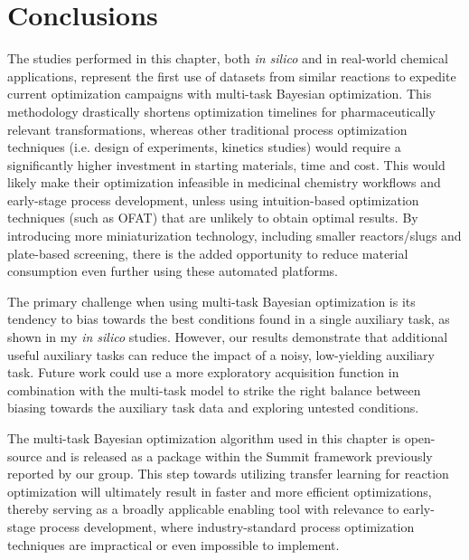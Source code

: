 \section{Conclusions}

The studies performed in this chapter, both \textit{in silico} and in real-world chemical applications, represent the first use of datasets from similar reactions to expedite current optimization campaigns with multi-task Bayesian optimization. This methodology drastically shortens optimization timelines for pharmaceutically relevant transformations, whereas other traditional process optimization techniques (i.e. design of experiments, kinetics studies) would require a significantly higher investment in starting materials, time and cost. This would likely make their optimization infeasible in medicinal chemistry workflows and early-stage process development, unless using intuition-based optimization techniques (such as OFAT) that are unlikely to obtain optimal results. By introducing more miniaturization technology, including smaller reactors/slugs and plate-based screening, there is the added opportunity to reduce material consumption even further using these automated platforms. 

The primary challenge when using multi-task Bayesian optimization is its tendency to bias towards the best conditions found in a single auxiliary task, as shown in my \textit{in silico} studies. However, our results demonstrate that additional useful auxiliary tasks can reduce the impact of a noisy, low-yielding auxiliary task. Future work could use a more exploratory acquisition function in combination with the multi-task model to strike the right balance between biasing towards the auxiliary task data and exploring untested conditions.

The multi-task Bayesian optimization algorithm used in this chapter is open-source and is released as a package within the Summit framework previously reported by our group. This step towards utilizing transfer learning for reaction optimization will ultimately result in faster and more efficient optimizations, thereby serving as a broadly applicable enabling tool with relevance to early-stage process development, where industry-standard process optimization techniques are impractical or even impossible to implement.


